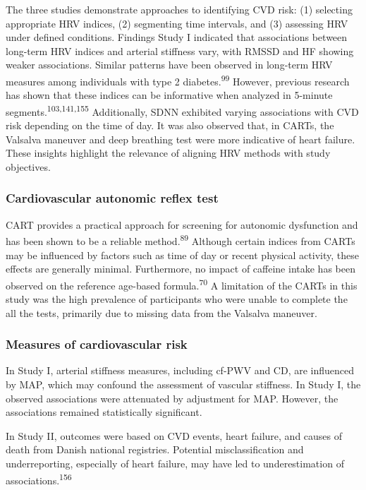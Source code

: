 \documentclass[
  a4paper,
  headsepline=true,
  open=any]{scrbook}
\begin{document}
The three studies demonstrate approaches to identifying CVD risk: (1)
selecting appropriate HRV indices, (2) segmenting time intervals, and
(3) assessing HRV under defined conditions. Findings Study I indicated
that associations between long-term HRV indices and arterial stiffness
vary, with RMSSD and HF showing weaker associations. Similar patterns
have been observed in long-term HRV measures among individuals with type
2 diabetes.\textsuperscript{99} However, previous research has shown
that these indices can be informative when analyzed in 5-minute
segments.\textsuperscript{103,141,155} Additionally, SDNN exhibited
varying associations with CVD risk depending on the time of day. It was
also observed that, in CARTs, the Valsalva maneuver and deep breathing
test were more indicative of heart failure. These insights highlight the
relevance of aligning HRV methods with study objectives.

\hypertarget{cardiovascular-autonomic-reflex-test}{%
\subsubsection{Cardiovascular autonomic reflex
test}\label{cardiovascular-autonomic-reflex-test}}

CART provides a practical approach for screening for autonomic
dysfunction and has been shown to be a reliable
method.\textsuperscript{89} Although certain indices from CARTs may be
influenced by factors such as time of day or recent physical activity,
these effects are generally minimal. Furthermore, no impact of caffeine
intake has been observed on the reference age-based
formula.\textsuperscript{70} A limitation of the CARTs in this study was
the high prevalence of participants who were unable to complete the all
the tests, primarily due to missing data from the Valsalva maneuver.

\hypertarget{measures-of-cardiovascular-risk}{%
\subsubsection{Measures of cardiovascular
risk}\label{measures-of-cardiovascular-risk}}

In Study I, arterial stiffness measures, including cf-PWV and CD, are
influenced by MAP, which may confound the assessment of vascular
stiffness. In Study I, the observed associations were attenuated by
adjustment for MAP. However, the associations remained statistically
significant.

In Study II, outcomes were based on CVD events, heart failure, and
causes of death from Danish national registries. Potential
misclassification and underreporting, especially of heart failure, may
have led to underestimation of associations.\textsuperscript{156}
\end{document}
